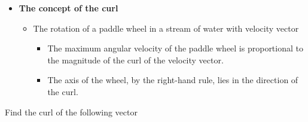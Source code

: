 \begin{ELunit}

\begin{itemize}
\tightlist
\item
  \textbf{The concept of the curl}

  \begin{itemize}
  \tightlist
  \item
    The rotation of a paddle wheel in a stream of water with velocity vector 

    \begin{itemize}
    \tightlist
    \item
      The maximum angular velocity of the paddle wheel is proportional to the magnitude of the curl of the velocity vector.
    \item
      The axis of the wheel, by the right-hand rule, lies in the direction of the curl.
    \end{itemize}
  \end{itemize}
\end{itemize}


\end{ELunit}


\begin{ELexample}{}

Find the curl of the following vector

\begin{ELsolution}



\end{ELsolution}

\end{ELexample}

\ELhold


\begin{ELunit}


\end{ELunit}

